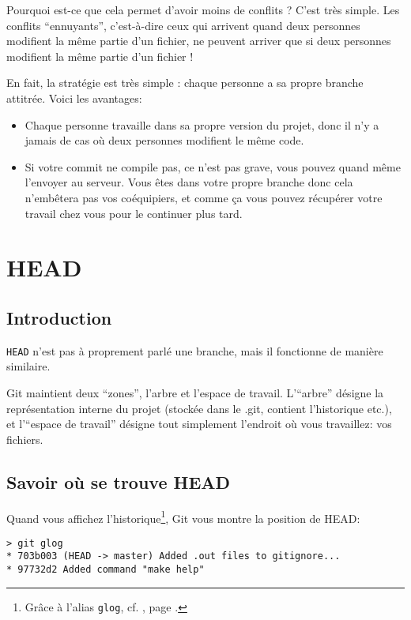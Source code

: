 \documentclass[10pt,a4paper]{article}
\begin{document}
Pourquoi est-ce que cela permet d'avoir moins de conflits ? C'est très simple. Les conflits ``ennuyants'', c'est-à-dire ceux qui arrivent quand deux personnes modifient la même partie d'un fichier, ne peuvent arriver que si deux personnes modifient la même partie d'un fichier !

En fait, la stratégie est très simple : chaque personne a sa propre branche attitrée. Voici les avantages:

\begin{itemize}
\item Chaque personne travaille dans sa propre version du projet, donc il n'y a jamais de cas où deux personnes modifient le même code.
\item Si votre commit ne compile pas, ce n'est pas grave, vous pouvez quand même l'envoyer au serveur. Vous êtes dans votre propre branche donc cela n'embêtera pas vos coéquipiers, et comme ça vous pouvez récupérer votre travail chez vous pour le continuer plus tard.
\end{itemize}

\section{HEAD\label{head}}

\subsection{Introduction}

{\tt HEAD} n'est pas à proprement parlé une branche, mais il fonctionne de manière similaire.

Git maintient deux ``zones'', l'arbre et l'espace de travail. L'``arbre'' désigne la représentation interne du projet (stockée dans le .git, contient l'historique etc.), et l'``espace de travail'' désigne tout simplement l'endroit où vous travaillez: vos fichiers.

\subsection{Savoir où se trouve HEAD} Quand vous affichez l'historique\footnote{Grâce à l'alias {\tt glog}, cf. \textit{}, page \pageref{alias}.}, Git vous montre la position de HEAD:

\begin{verbatim}
> git glog
* 703b003 (HEAD -> master) Added .out files to gitignore...
* 97732d2 Added command "make help"
\end{verbatim}
\end{document}
